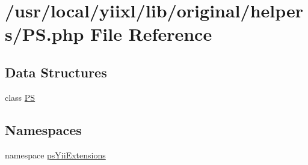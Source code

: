 \hypertarget{PS_8php}{
\section{/usr/local/yiixl/lib/original/helpers/PS.php File Reference}
\label{PS_8php}
}
\subsection*{Data Structures}
\begin{DoxyCompactItemize}
\item 
class \hyperlink{classPS}{PS}
\end{DoxyCompactItemize}
\subsection*{Namespaces}
\begin{DoxyCompactItemize}
\item 
namespace \hyperlink{namespacepsYiiExtensions}{psYiiExtensions}
\end{DoxyCompactItemize}
